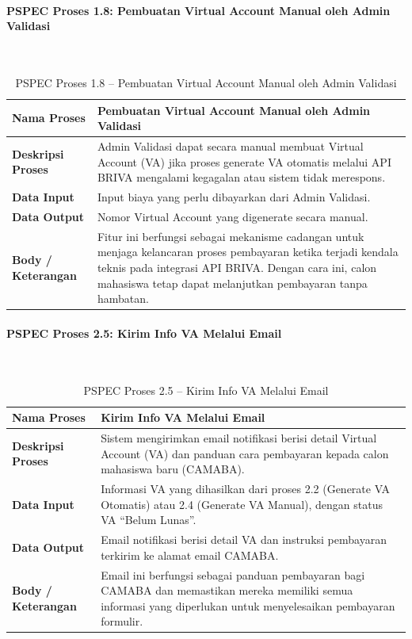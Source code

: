 \paragraph{PSPEC Proses 1.8: Pembuatan Virtual Account Manual oleh Admin Validasi}~\\
\begin{longtable}{|p{}|p{}|}
	\caption{PSPEC Proses 1.8 -- Pembuatan Virtual Account Manual oleh Admin Validasi}
	\label{table:3.pspec18}\\
	\hline
	\textbf{Nama Proses} & Pembuatan Virtual Account Manual oleh Admin Validasi \\
	\hline
	\textbf{Deskripsi Proses} & Admin Validasi dapat secara manual membuat Virtual Account (VA) jika proses generate VA otomatis melalui API BRIVA mengalami kegagalan atau sistem tidak merespons. \\
	\hline
	\textbf{Data Input} & Input biaya yang perlu dibayarkan dari Admin Validasi. \\
	\hline
	\textbf{Data Output} & Nomor Virtual Account yang digenerate secara manual. \\
	\hline
	\textbf{Body / Keterangan} & Fitur ini berfungsi sebagai mekanisme cadangan untuk menjaga kelancaran proses pembayaran ketika terjadi kendala teknis pada integrasi API BRIVA. Dengan cara ini, calon mahasiswa tetap dapat melanjutkan pembayaran tanpa hambatan. \\
	\hline
\end{longtable}

\paragraph{PSPEC Proses 2.5: Kirim Info VA Melalui Email}~\\
\begin{longtable}{|p{}|p{}|}
	\caption{PSPEC Proses 2.5 -- Kirim Info VA Melalui Email}
	\label{table:3.pspec25}\\
	\hline
	\textbf{Nama Proses} & Kirim Info VA Melalui Email \\
	\hline
	\textbf{Deskripsi Proses} & Sistem mengirimkan email notifikasi berisi detail Virtual Account (VA) dan panduan cara pembayaran kepada calon mahasiswa baru (CAMABA). \\
	\hline
	\textbf{Data Input} & Informasi VA yang dihasilkan dari proses 2.2 (Generate VA Otomatis) atau 2.4 (Generate VA Manual), dengan status VA “Belum Lunas”. \\
	\hline
	\textbf{Data Output} & Email notifikasi berisi detail VA dan instruksi pembayaran terkirim ke alamat email CAMABA. \\
	\hline
	\textbf{Body / Keterangan} & Email ini berfungsi sebagai panduan pembayaran bagi CAMABA dan memastikan mereka memiliki semua informasi yang diperlukan untuk menyelesaikan pembayaran formulir. \\
	\hline
\end{longtable}

